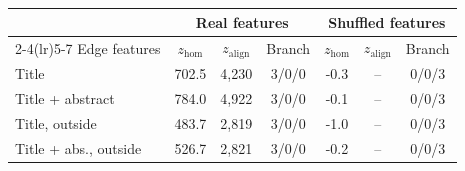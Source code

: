 \begin{tabular}{l ccc ccc}
\toprule
 & \multicolumn{3}{c}{Real features} & \multicolumn{3}{c}{Shuffled features} \\
\cmidrule(lr){2-4}\cmidrule(lr){5-7}
Edge features & $z_{\text{hom}}$ & $z_{\text{align}}$ & Branch & $z_{\text{hom}}$ & $z_{\text{align}}$ & Branch \\
\midrule
Title & 702.5 & 4,230 & 3/0/0 & -0.3 & -- & 0/0/3 \\
Title + abstract & 784.0 & 4,922 & 3/0/0 & -0.1 & -- & 0/0/3 \\
Title, outside & 483.7 & 2,819 & 3/0/0 & -1.0 & -- & 0/0/3 \\
Title + abs., outside & 526.7 & 2,821 & 3/0/0 & -0.2 & -- & 0/0/3 \\
\bottomrule
\end{tabular}
